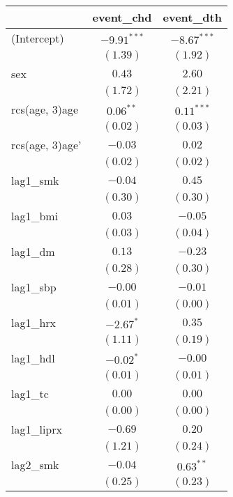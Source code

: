 
\begin{tabular}{l c c}
\toprule
 & event_chd & event_dth \\
\midrule
(Intercept)           & $-9.91^{***}$ & $-8.67^{***}$ \\
                      & $(1.39)$      & $(1.92)$      \\
sex                   & $0.43$        & $2.60$        \\
                      & $(1.72)$      & $(2.21)$      \\
rcs(age, 3)age        & $0.06^{**}$   & $0.11^{***}$  \\
                      & $(0.02)$      & $(0.03)$      \\
rcs(age, 3)age'       & $-0.03$       & $0.02$        \\
                      & $(0.02)$      & $(0.02)$      \\
lag1\_smk             & $-0.04$       & $0.45$        \\
                      & $(0.30)$      & $(0.30)$      \\
lag1\_bmi             & $0.03$        & $-0.05$       \\
                      & $(0.03)$      & $(0.04)$      \\
lag1\_dm              & $0.13$        & $-0.23$       \\
                      & $(0.28)$      & $(0.30)$      \\
lag1\_sbp             & $-0.00$       & $-0.01$       \\
                      & $(0.01)$      & $(0.00)$      \\
lag1\_hrx             & $-2.67^{*}$   & $0.35$        \\
                      & $(1.11)$      & $(0.19)$      \\
lag1\_hdl             & $-0.02^{*}$   & $-0.00$       \\
                      & $(0.01)$      & $(0.01)$      \\
lag1\_tc              & $0.00$        & $0.00$        \\
                      & $(0.00)$      & $(0.00)$      \\
lag1\_liprx           & $-0.69$       & $0.20$        \\
                      & $(1.21)$      & $(0.24)$      \\
lag2\_smk             & $-0.04$       & $0.63^{**}$   \\
                      & $(0.25)$      & $(0.23)$      \\

\end{tabular}

